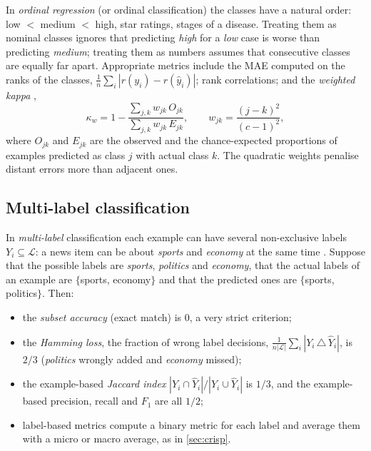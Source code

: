 In \emph{ordinal regression} (or ordinal classification) the classes have a natural order:
low $<$ medium $<$ high, star ratings, stages of a disease. Treating them as nominal classes
ignores that predicting \emph{high} for a \emph{low} case is worse than predicting
\emph{medium}; treating them as numbers assumes that consecutive classes are equally far
apart. Appropriate metrics \citep{gutierrez2016ordinal} include the MAE computed on the ranks
of the classes, $\frac1n\sum_i|r(y_i)-r(\hat y_i)|$; rank correlations; and the
\emph{weighted kappa} \citep{cohen1968weighted},
\begin{equation}
  \kappa_w=1-\frac{\sum_{j,k}w_{jk}\,O_{jk}}{\sum_{j,k}w_{jk}\,E_{jk}},
  \qquad w_{jk}=\frac{(j-k)^2}{(c-1)^2},
\end{equation}
where $O_{jk}$ and $E_{jk}$ are the observed and the chance-expected proportions of examples
predicted as class $j$ with actual class $k$. The quadratic weights penalise distant errors
more than adjacent ones.

\subsection{Multi-label classification}

In \emph{multi-label} classification each example can have several non-exclusive labels
$Y_i\subseteq\mathcal L$: a news item can be about \emph{sports} and \emph{economy} at the same
time \citep{tsoumakas2007multi}. Suppose that the possible labels are \emph{sports},
\emph{politics} and \emph{economy}, that the actual labels of an example are
$\{$sports, economy$\}$ and that the predicted ones are $\{$sports, politics$\}$. Then:
\begin{itemize}
  \item the \emph{subset accuracy} (exact match) is 0, a very strict criterion;
  \item the \emph{Hamming loss}, the fraction of wrong label decisions,
        $\frac{1}{n|\mathcal L|}\sum_i|Y_i\,\triangle\,\hat Y_i|$, is $2/3$ (\emph{politics}
        wrongly added and \emph{economy} missed);
  \item the example-based \emph{Jaccard index} $|Y_i\cap\hat Y_i|/|Y_i\cup\hat Y_i|$ is $1/3$,
        and the example-based precision, recall and $F_1$ are all $1/2$;
  \item label-based metrics compute a binary metric for each label and average them with a
        micro or macro average, as in \cref{sec:crisp}.
\end{itemize}

